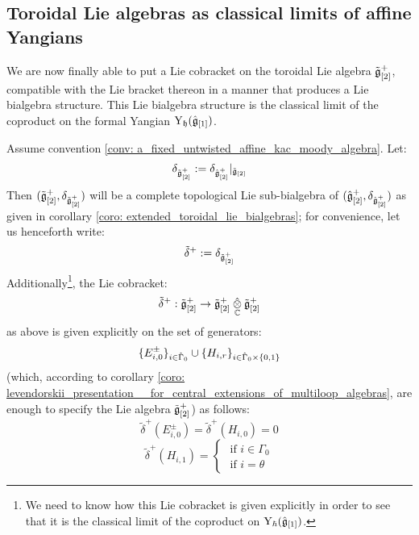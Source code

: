         \subsection{Toroidal Lie algebras as classical limits of affine Yangians}
            We are now finally able to put a Lie cobracket on the toroidal Lie algebra $\tilde{\mathfrak{g}}_{[2]}^+$, compatible with the Lie bracket thereon in a manner that produces a Lie bialgebra structure. This Lie bialgebra structure is the classical limit of the coproduct on the formal Yangian $\mathrm{Y}_{\mathfrak{h}}(\hat{\mathfrak{g}}_{[1]})$. 
            \begin{lemma} \label{lemma: toroidal_lie_bialgebras}
                Assume convention \ref{conv: a_fixed_untwisted_affine_kac_moody_algebra}. Let:
                    $$\delta_{\tilde{\mathfrak{g}}_{[2]}^+} := \delta_{\hat{\mathfrak{g}}_{[2]}^+}|_{\tilde{\mathfrak{g}}_{[2]}}$$
                Then $(\tilde{\mathfrak{g}}_{[2]}^+, \delta_{\tilde{\mathfrak{g}}_{[2]}^+})$ will be a complete topological Lie sub-bialgebra of $(\hat{\mathfrak{g}}_{[2]}^+, \delta_{\hat{\mathfrak{g}}_{[2]}^+})$ as given in corollary \ref{coro: extended_toroidal_lie_bialgebras}; for convenience, let us henceforth write:
                    $$\tilde{\delta}^+ := \delta_{\tilde{\mathfrak{g}}_{[2]}^+}$$
                Additionally\footnote{We need to know how this Lie cobracket is given explicitly in order to see that it is the classical limit of the coproduct on $\mathrm{Y}_{\hbar}(\hat{\mathfrak{g}}_{[1]})$.}, the Lie cobracket:
                    $$\tilde{\delta}^+: \tilde{\g}_{[2]}^+ \to \tilde{\g}_{[2]}^+ \hattensor_{\bbC} \tilde{\g}_{[2]}^+$$
                as above is given explicitly on the set of generators:
                    $$\{ E_{i, 0}^{\pm} \}_{i \in \hat{\Gamma}_0} \cup \{ H_{i, r} \}_{i \in \hat{\Gamma}_0 \x \{0, 1\}}$$
                (which, according to corollary \ref{coro: levendorskii_presentation__for_central_extensions_of_multiloop_algebras}, are enough to specify the Lie algebra $\tilde{\mathfrak{g}}_{[2]}^+$) as follows:
                    $$\tilde{\delta}^+(E_{i, 0}^{\pm}) = \tilde{\delta}^+(H_{i, 0}) = 0$$
                    $$
                        \tilde{\delta}^+(H_{i, 1}) =
                        \begin{cases}
                            \text{ if $i \in \Gamma_0$}
                            \\
                            \text{ if $i = \theta$}
                        \end{cases}
                    $$
            \end{lemma}
